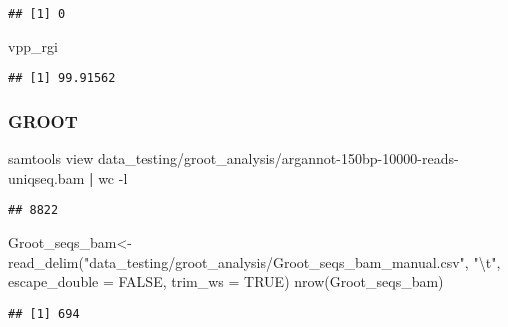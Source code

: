 \documentclass[
]{article}
\newenvironment{Shaded}{\begin{snugshade}}{\end{snugshade}}
\newcommand{\AttributeTok}[1]{\textcolor[rgb]{0.77,0.63,0.00}{#1}}
\newcommand{\ConstantTok}[1]{\textcolor[rgb]{0.00,0.00,0.00}{#1}}
\newcommand{\ExtensionTok}[1]{#1}
\newcommand{\FunctionTok}[1]{\textcolor[rgb]{0.00,0.00,0.00}{#1}}
\newcommand{\KeywordTok}[1]{\textcolor[rgb]{0.13,0.29,0.53}{\textbf{#1}}}
\newcommand{\NormalTok}[1]{#1}
\newcommand{\OtherTok}[1]{\textcolor[rgb]{0.56,0.35,0.01}{#1}}
\newcommand{\SpecialCharTok}[1]{\textcolor[rgb]{0.00,0.00,0.00}{#1}}
\newcommand{\StringTok}[1]{\textcolor[rgb]{0.31,0.60,0.02}{#1}}
\begin{document}
\begin{verbatim}
## [1] 0
\end{verbatim}

\begin{Shaded}
\begin{Highlighting}[]
\NormalTok{vpp\_rgi}
\end{Highlighting}
\end{Shaded}

\begin{verbatim}
## [1] 99.91562
\end{verbatim}

\hypertarget{groot-1}{%
\subsubsection{GROOT}\label{groot-1}}

\begin{Shaded}
\begin{Highlighting}[]
\ExtensionTok{samtools}\NormalTok{ view data\_testing/groot\_analysis/argannot{-}150bp{-}10000{-}reads{-}uniqseq.bam }\KeywordTok{|} \FunctionTok{wc} \AttributeTok{{-}l}
\end{Highlighting}
\end{Shaded}

\begin{verbatim}
## 8822
\end{verbatim}

\begin{Shaded}
\begin{Highlighting}[]
\NormalTok{Groot\_seqs\_bam}\OtherTok{\textless{}{-}} \FunctionTok{read\_delim}\NormalTok{(}\StringTok{"data\_testing/groot\_analysis/Groot\_seqs\_bam\_manual.csv"}\NormalTok{, }
    \StringTok{"}\SpecialCharTok{\textbackslash{}t}\StringTok{"}\NormalTok{, }\AttributeTok{escape\_double =} \ConstantTok{FALSE}\NormalTok{, }\AttributeTok{trim\_ws =} \ConstantTok{TRUE}\NormalTok{)}
\FunctionTok{nrow}\NormalTok{(Groot\_seqs\_bam)}
\end{Highlighting}
\end{Shaded}

\begin{verbatim}
## [1] 694
\end{verbatim}

\begin{Shaded}
\end{Shaded}
\end{document}
